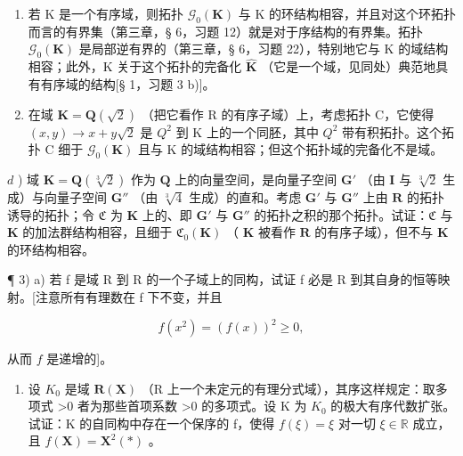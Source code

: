 \begin{enumerate}
\def\labelenumi{\alph{enumi})}
\setcounter{enumi}{1}
\item
若 K 是一个有序域，则拓扑 \(\mathcal{G}_{0}(\mathbf{K})\) 与 K 的环结构相容，并且对这个环拓扑而言的有界集（第三章，§ 6，习题 12）就是对于序结构的有界集。拓扑 \(\mathcal{G}_{0}(\mathbf{K})\) 是局部逆有界的（第三章，§ 6，习题 22），特别地它与 K 的域结构相容；此外，K 关于这个拓扑的完备化 \(\hat{\mathbf{K}}\) （它是一个域，见同处）典范地具有有序域的结构{[}§ 1，习题 3 b){]}。
\item
在域 \(\mathbf{K} = \mathbf{Q}(\sqrt{2})\) （把它看作 R 的有序子域）上，考虑拓扑 C，它使得 \((x, y) \to x + y\sqrt{2}\) 是 \(Q^{2}\) 到 K 上的一个同胚，其中 \(Q^{2}\) 带有积拓扑。这个拓扑 C 细于 \(\mathcal{G}_{0}(\mathbf{K})\) 且与 K 的域结构相容；但这个拓扑域的完备化不是域。
\end{enumerate}

\(d\) ) 域 \(\mathbf{K} = \mathbf{Q}(\sqrt[3]{2})\) 作为 \(\mathbf{Q}\) 上的向量空间，是向量子空间 \(\mathbf{G}'\) （由 \(\mathbf{I}\) 与 \(\sqrt[3]{2}\) 生成）与向量子空间 \(\mathbf{G}''\) （由 \(\sqrt[3]{4}\) 生成）的直和。考虑 \(\mathbf{G}'\) 与 \(\mathbf{G}''\) 上由 \(\mathbf{R}\) 的拓扑诱导的拓扑；令 \(\mathfrak{C}\) 为 \(\mathbf{K}\) 上的、即 \(\mathbf{G}'\) 与 \(\mathbf{G}''\) 的拓扑之积的那个拓扑。试证：\(\mathfrak{C}\) 与 \(\mathbf{K}\) 的加法群结构相容，且细于 \(\mathfrak{C}_0(\mathbf{K})\) （ \(\mathbf{K}\) 被看作 \(\mathbf{R}\) 的有序子域），但不与 \(\mathbf{K}\) 的环结构相容。

¶ 3) a) 若 f 是域 R 到 R 的一个子域上的同构，试证 f 必是 R 到其自身的恒等映射。{[}注意所有有理数在 f 下不变，并且

\[
f (x ^ {2}) = (f (x)) ^ {2} \geqslant 0,
\]

从而 \(f\) 是递增的{]}。

\begin{enumerate}
\def\labelenumi{\alph{enumi})}
\setcounter{enumi}{1}
\tightlist
\item
设 \(K_{0}\) 是域 \(\mathbf{R}(\mathbf{X})\) （R 上一个未定元的有理分式域），其序这样规定：取多项式 \textgreater0 者为那些首项系数 \textgreater0 的多项式。设 K 为 \(K_{0}\) 的极大有序代数扩张。试证：K 的自同构中存在一个保序的 f，使得 \(f(\xi)=\xi\) 对一切 \(\xi\in\mathbb{R}\) 成立，且 \(f(\mathbf{X})=\mathbf{X}^{2}(*)\) 。
\end{enumerate}

\BourbakiExerciseGroup

